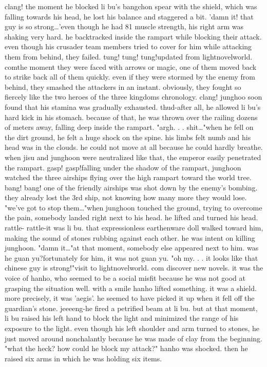 clang! the moment he blocked li bu's bangchon spear with the shield, which was falling towards his head, he lost his balance and staggered a bit.
'damn it! that guy is so strong…'even though he had 81 muscle strength, his right arm was shaking very hard.
 he backtracked inside the rampart while blocking their attack.
even though his crusader team members tried to cover for him while attacking them from behind, they failed.
tung! tung! tung!updated from lightnovelworld.
c‌omthe moment they were faced with arrows or magic, one of them moved back to strike back all of them quickly.
 even if they were stormed by the enemy from behind, they smashed the attackers in an instant.
 obviously, they fought so fiercely like the two heroes of the three kingdoms chronology.
clang! junghoo soon found that his stamina was gradually exhausted.
thud-after all, he allowed li bu's hard kick in his stomach.
 because of that, he was thrown over the railing dozens of meters away, falling deep inside the rampart.
"argh.
.
.
shit…"when he fell on the dirt ground, he felt a huge shock on the spine.
his limbs felt numb and his head was in the clouds.
 he could not move at all because he could hardly breathe.
when jisu and junghoon were neutralized like that, the emperor easily penetrated the rampart.
gasp! gasp!falling under the shadow of the rampart, junghoon watched the three airships flying over the high rampart toward the world tree.
bang! bang! one of the friendly airships was shot down by the enemy's bombing.
 they already lost the 3rd ship, not knowing how many more they would lose.
 "we've got to stop them…"when junghoon touched the ground, trying to overcome the pain, somebody landed right next to his head.
 he lifted and turned his head.
 rattle- rattle-it was li bu.
 that expressionless earthenware doll walked toward him, making the sound of stones rubbing against each other.
 he was intent on killing junghoon.
"damn it…"at that moment, somebody else appeared next to him.
 was he guan yu?fortunately for him, it was not guan yu.
"oh my.
.
.
it looks like that chinese guy is strong!"visit to lightnovelworld.
c‌om discover new novels.
it was the voice of hanho, who seemed to be a social misfit because he was not good at grasping the situation well.
with a smile hanho lifted something.
 it was a shield.
 more precisely, it was 'aegis'.
 he seemed to have picked it up when it fell off the guardian's stone.
jeeeeng-he fired a petrified beam at li bu.
 but at that moment, li bu raised his left hand to block the light and minimized the range of his exposure to the light.
even though his left shoulder and arm turned to stones, he just moved around nonchalantly because he was made of clay from the beginning.
"what the heck? how could he block my attack?" hanho was shocked.
 then he raised six arms in which he was holding six items.


